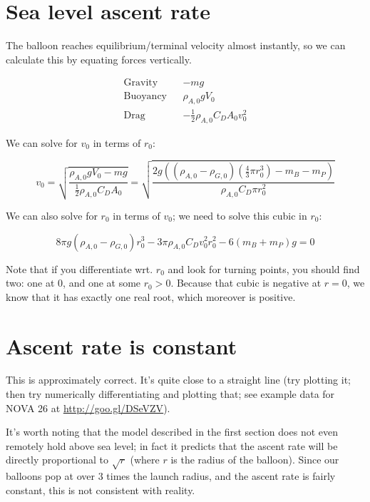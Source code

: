 \documentclass{article}
\begin{document}
\section{Sea level ascent rate}

The balloon reaches equilibrium/terminal velocity almost instantly,
so we can calculate this by equating forces vertically.

\begin{align*}
    \text{Gravity} && -mg \\
    \text{Buoyancy} && \rho_{A,0} g V_0 \\
    \text{Drag} && -\frac{1}{2} \rho_{A,0} C_D A_0 v_0^2
\end{align*}

We can solve for $v_0$ in terms of $r_0$:

\[
    v_0
    = \sqrt{
        \frac{ \rho_{A,0}gV_0 - mg }%
             { \frac{1}{2} \rho_{A,0} C_D A_0 }
        }
%
    = \sqrt{
        \frac{ 2g ((\rho_{A,0} - \rho_{G,0}) (\frac{4}{3} \pi r_0^3) - m_B - m_P) }%
             { \rho_{A,0} C_D \pi r_0^2 }
        }
\]

We can also solve for $r_0$ in terms of $v_0$; we need to solve this cubic in $r_0$:

\[
       8 \pi g (\rho_{A,0} - \rho_{G,0}) r_0^3
     - 3 \pi \rho_{A,0} C_D v_0^2 r_0 ^2
     - 6 (m_B + m_P) g
      = 0
\]

Note that if you differentiate wrt. $r_0$ and look for turning points, you should find two:
one at $0$, and one at some $r_0 > 0$. Because that cubic is negative at $r = 0$, we know
that it has exactly one real root, which moreover is positive.

\section{Ascent rate is constant}

This is approximately correct. It's quite close to a straight line
(try plotting it; then try numerically differentiating and plotting that; see example data
for NOVA 26 at
\underline{\href{http://nbviewer.ipython.org/github/danielrichman/burst-calc-notes/blob/master/actual-data.ipynb}{http://goo.gl/DSeVZV}}).

It's worth noting that the model described in the first section does not even remotely hold
above sea level; in fact it predicts that the ascent rate will be directly proportional
to $\sqrt{r}$ (where $r$ is the radius of the balloon). Since our balloons pop at over
$3$ times the launch radius, and the ascent rate is fairly constant,
this is not consistent with reality.
\end{document}
